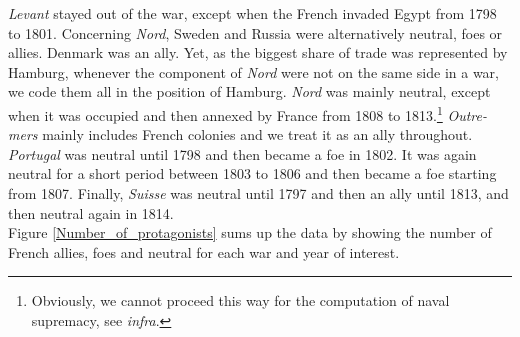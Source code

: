 \documentclass[12pt,a4paper,notitlepage,english]{article}
\begin{document}
\textit{Levant} stayed out of the war, except when the French invaded Egypt from 1798 to 1801.
Concerning \textit{Nord}, Sweden and Russia were alternatively neutral, foes or allies. Denmark was an ally. Yet, as the biggest share of trade was represented by Hamburg, whenever the component of \textit{Nord} were not on the same side in a war, we code them all in the position of Hamburg. \textit{Nord} was mainly neutral, except when it was occupied and then annexed by France from 1808 to 1813.\footnote{Obviously, we cannot proceed this way for the computation of naval supremacy, see \textit{infra}.}
\textit{Outre-mers} mainly includes French colonies and we treat it as an ally throughout.
\textit{Portugal} was neutral until 1798 and then became a foe in 1802.
It was again neutral for a short period between 1803 to 1806 and then became a foe starting from 1807.
Finally, \textit{Suisse} was neutral until 1797 and then an ally until 1813, and then neutral again in 1814. \\
Figure \ref{Number_of_protagonists} sums up the data by showing the number of French allies, foes and neutral for each war and year of interest. 
\end{document}
